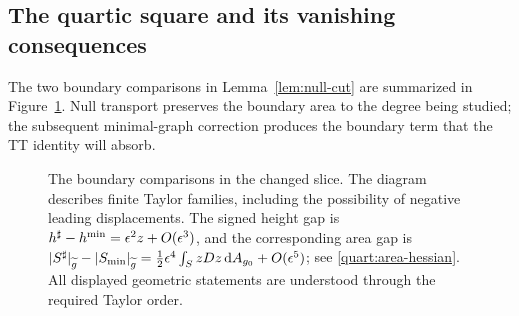 \subsection{The quartic square and its vanishing consequences}

The two boundary comparisons in Lemma~\ref{lem:null-cut} are
summarized in Figure~\ref{fig:boundary-comparisons}.  Null transport
preserves the boundary area to the degree being studied; the
subsequent minimal-graph correction produces the boundary term
that the TT identity will absorb.

\begin{figure}[ht]
\centering
{}
\caption{The boundary comparisons in the changed slice.  The diagram
describes finite Taylor families, including the possibility of negative
leading displacements. The signed height gap is
$h^\sharp-h^{\min}=\epsilon^2z+O(\epsilon^3)$, and the corresponding area gap is
$|S^\sharp|_{\widetilde g}-|S_{\min}|_{\widetilde g}
=\frac12\epsilon^4\int_S zDz\,\mathrm{d} A_{g_0}+O(\epsilon^5)$;
see \eqref{quart:area-hessian}. All displayed geometric statements are
understood through the required Taylor order.}
\label{fig:boundary-comparisons}
\end{figure}

